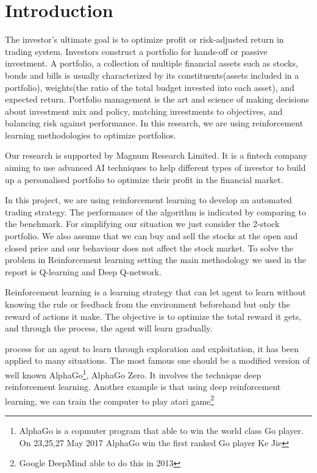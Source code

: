 \chapter{Introduction}\label{Ch:Introduction}

The investor’s ultimate goal is to optimize profit or risk-adjusted return in trading system. Investors construct a portfolio for hands-off or passive investment. A portfolio, a collection of multiple financial assets such as stocks, bonds and bills is usually characterized by its constituents(assets included in a portfolio), weights(the ratio of the total budget invested into each asset), and expected return. Portfolio management is the art and science of making decisions about investment mix and policy, matching investments to objectives, and balancing risk against performance. In this research, we are using reinforcement learning methodologies to optimize portfolios. 

Our research is supported by Magnum Research Limited. It is a fintech company aiming to use advanced AI techniques to help different types of investor to build up a personalised portfolio to optimize their profit in the financial market.

In this project, we are using reinforcement learning to develop an automated trading strategy. The performance of the algorithm is indicated by comparing to the benchmark. For simplifying our situation we just consider the 2-stock portfolio. We also assume that we can buy and sell the stocks at the open and closed price and our behaviour does not affect the stock market. To solve the problem in Reinforcement learning setting the main methodology we used in the report is Q-learning and Deep Q-network. 

Reinforcement learning is a learning strategy that can let agent to learn without knowing the rule or feedback from the environment beforehand but only the reward of actions it make. The objective is to optimize the total reward it gets, and through the process, the agent will learn gradually.

process for an agent to learn through exploration and exploitation, it has been applied to many situations. The most famous one should be a modified version of well known AlphaGo\footnote{AlphaGo is a copmuter program that able to win the world class Go player. On 23,25,27 May 2017 AlphaGo win the first ranked Go player Ke Jie}, AlphaGo Zero. It involves the technique deep reinforcement learning. Another example is that using deep reinforcement learning, we can train the computer to play atari game\footnote{Google DeepMind able to do this in 2013}